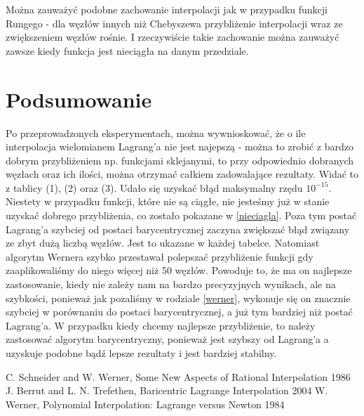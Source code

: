 \documentclass[11pt, wide]{article}
\begin{document}
Można zauważyć podobne zachowanie interpolacji jak w przypadku funkcji Rungego - dla węzłów innych
niż Chebyszewa przybliżenie interpolacji wraz ze zwiększeniem węzłów rośnie. I rzeczywiście
takie zachowanie można zauważyć zawsze kiedy funkcja jest nieciągła na danym przedziale.
\section{Podsumowanie}
Po przeprowadzonych eksperymentach, można wywnioskować, że o ile interpolacja
wielomianem Lagrang'a nie jest najepszą - można to zrobić 
z bardzo dobrym przybliżeniem np. funkcjami sklejanymi, to przy odpowiednio dobranych węzłach oraz
ich ilości, można otrzymać całkiem zadowalające rezultaty. Widać to z tablicy (1), (2) oraz (3). Udało się
uzyskać błąd maksymalny rzędu $10^{-15}$. Niestety w przypadku funkcji, które nie są ciągłe, nie jesteśmy już w stanie
uzyskać dobrego przybliżenia, co zostało pokazane w \ref{nieciagla}. Poza tym postać Lagrang'a szybciej od postaci barycentrycznej zaczyna
zwiększać błąd związany ze zbyt dużą liczbą węzłów. Jest to ukazane w każdej tabelce. Natomiast algorytm
Wernera szybko przestawał polepszać przybliżenie funkcji gdy zaaplikowaliśmy do niego więcej niż 50 węzłów. 
Powoduje to, że ma on najlepsze zastosowanie, kiedy nie zależy nam na bardzo precyzyjnych wynikach, ale na szybkości, ponieważ
jak pozaliśmy w rodziale \ref{werner}, wykonuje się on znacznie szybciej w porównaniu do postaci barycentrycznej, a już tym bardziej niż 
postać Lagrang'a. W przypadku kiedy chcemy najlepsze przybliżenie, to należy zastosować algorytm barycentryczny, ponieważ jest szybszy od Lagrang'a a uzyskuje
podobne bądź lepsze rezultaty i jest bardziej stabilny.
\begin{thebibliography}{9}
    \itemsep2pt
     C. Schneider and W. Werner, Some New Aspects of Rational Interpolation 1986
     J. Berrut and L. N. Trefethen, Baricentric Lagrange Interpolation 2004
     W. Werner, Polynomial Interpolation: Lagrange versus Newton 1984
\end{thebibliography}    
\end{document}
